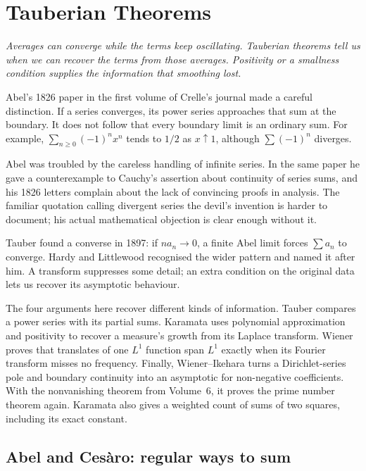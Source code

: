 \chapter{Tauberian Theorems}\label{ch:tauberian}

\begin{center}\itshape
Averages can converge while the terms keep oscillating. Tauberian theorems tell us when we can recover the terms from those averages. Positivity or a smallness condition supplies the information that smoothing lost.
\end{center}

Abel's 1826 paper in the first volume of Crelle's journal made a careful distinction. If a series converges, its power series approaches that sum at the boundary. It does not follow that every boundary limit is an ordinary sum. For example, $\sum_{n\ge0}(-1)^nx^n$ tends to $1/2$ as $x\uparrow1$, although $\sum(-1)^n$ diverges.

Abel was troubled by the careless handling of infinite series. In the same paper he gave a counterexample to Cauchy's assertion about continuity of series sums, and his 1826 letters complain about the lack of convincing proofs in analysis. The familiar quotation calling divergent series the devil's invention is harder to document; his actual mathematical objection is clear enough without it.

Tauber found a converse in 1897: if $na_n\to0$, a finite Abel limit forces $\sum a_n$ to converge. Hardy and Littlewood recognised the wider pattern and named it after him. A transform suppresses some detail; an extra condition on the original data lets us recover its asymptotic behaviour.

The four arguments here recover different kinds of information. Tauber compares a power series with its partial sums. Karamata uses polynomial approximation and positivity to recover a measure's growth from its Laplace transform. Wiener proves that translates of one $L^1$ function span $L^1$ exactly when its Fourier transform misses no frequency. Finally, Wiener--Ikehara turns a Dirichlet-series pole and boundary continuity into an asymptotic for non-negative coefficients. With the nonvanishing theorem from Volume~6, it proves the prime number theorem again. Karamata also gives a weighted count of sums of two squares, including its exact constant.

\section{Abel and Ces\`aro: regular ways to sum}

